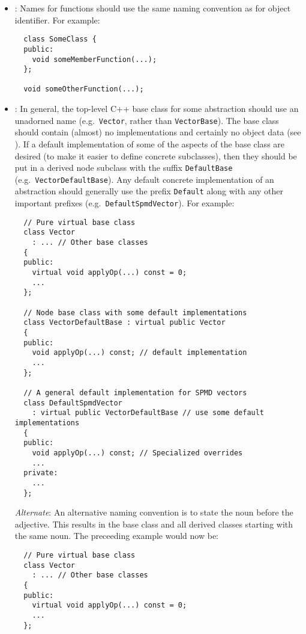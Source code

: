 \begin{itemize}
\item\NCFunctionNames: Names for functions should use the same naming
  convention as for object identifier.  For example:

{\small\begin{verbatim}
  class SomeClass {
  public:
    void someMemberFunction(...);
  };

  void someOtherFunction(...);
\end{verbatim}}


\item\NCBaseDefaultClassNames: In general, the top-level C++ base
  class for some abstraction should use an unadorned name (e.g.\
  \texttt{Vector}, rather than \texttt{VectorBase}).  The base class
  should contain (almost) no implementations and certainly no object
  data (see \cite[Item 36]{C++CodingStandards05}).  If a default
  implementation of some of the aspects of the base class are desired
  (to make it easier to define concrete subclasses), then they should
  be put in a derived node subclass with the suffix
  \texttt{DefaultBase} (e.g.\ \texttt{Vector\-Default\-Base}).  Any
  default concrete implementation of an abstraction should generally
  use the prefix \texttt{Default} along with any other important
  prefixes (e.g.\ \texttt{DefaultSpmdVector}).  For example:

{\small\begin{verbatim}
  // Pure virtual base class 
  class Vector
    : ... // Other base classes
  {
  public:
    virtual void applyOp(...) const = 0;
    ...
  };

  // Node base class with some default implementations
  class VectorDefaultBase : virtual public Vector
  {
  public:
    void applyOp(...) const; // default implementation
    ...
  };

  // A general default implementation for SPMD vectors
  class DefaultSpmdVector
    : virtual public VectorDefaultBase // use some default implementations
  {
  public:
    void applyOp(...) const; // Specialized overrides
    ...
  private:
    ...
  };
\end{verbatim}}

  \textit{Alternate}: An alternative naming convention is to state the
  noun before the adjective.  This results in the base class and all derived classes starting with the same noun.  The preceeding example would now be:

{\small\begin{verbatim}
  // Pure virtual base class 
  class Vector
    : ... // Other base classes
  {
  public:
    virtual void applyOp(...) const = 0;
    ...
  };


\end{verbatim}}
\end{itemize}
